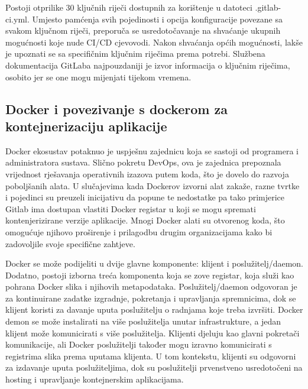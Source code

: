 \documentclass[a4paper,12pt,oneside]{article}
\begin{document}
Postoji otprilike 30 ključnih riječi dostupnih za korištenje u datoteci .gitlab-ci.yml. Umjesto pamćenja svih pojedinosti i opcija konfiguracije povezane sa svakom ključnom riječi, preporuča se usredotočavanje na shvaćanje ukupnih mogućnosti koje nude CI/CD cjevovodi. Nakon shvaćanja općih mogućnosti, lakše je upoznati se sa specifičnim ključnim riječima prema potrebi. Službena dokumentacija GitLaba najpouzdaniji je izvor informacija o ključnim riječima, osobito jer se one mogu mijenjati tijekom vremena.

\subsection{Docker i povezivanje s dockerom za kontejnerizaciju aplikacije}

Docker ekosustav potaknuo je uspješnu zajednicu koja se sastoji od programera i administratora sustava. Slično pokretu DevOps, ova je zajednica prepoznala vrijednost rješavanja operativnih izazova putem koda, što je dovelo do razvoja poboljšanih alata. U slučajevima kada Dockerov izvorni alat zakaže, razne tvrtke i pojedinci su preuzeli inicijativu da popune te nedostatke pa tako primjerice Gitlab ima dostupan vlastiti Docker registar u koji se mogu spremati kontenjerizirane verzije aplikacije. Mnogi Docker alati su otvorenog koda, što omogućuje njihovo proširenje i prilagodbu drugim organizacijama kako bi zadovoljile svoje specifične zahtjeve. 

Docker se može podijeliti u dvije glavne komponente: klijent i poslužitelj/daemon. Dodatno, postoji izborna treća komponenta koja se zove registar, koja služi kao pohrana Docker slika i njihovih metapodataka. Poslužitelj/daemon odgovoran je za kontinuirane zadatke izgradnje, pokretanja i upravljanja spremnicima, dok se klijent koristi za davanje uputa poslužitelju o radnjama koje treba izvršiti. Docker demon se može instalirati na više poslužitelja unutar infrastrukture, a jedan klijent može komunicirati s više poslužitelja. Klijenti djeluju kao glavni pokretači komunikacije, ali Docker poslužitelji također mogu izravno komunicirati s registrima slika prema uputama klijenta. U tom kontekstu, klijenti su odgovorni za izdavanje uputa poslužiteljima, dok su poslužitelji prvenstveno usredotočeni na hosting i upravljanje kontejnerskim aplikacijama.
\end{document}
